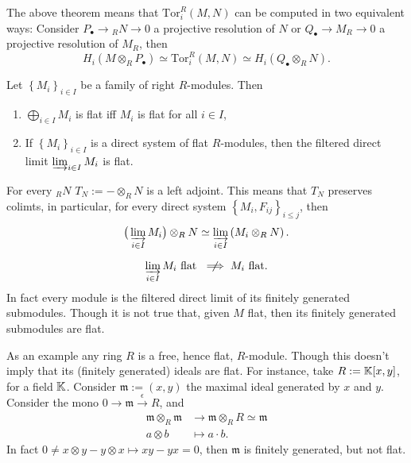 \begin{rem}[Consequence]
	The above theorem means that $\mathrm{Tor}_i^R(M,N)$ can be computed in two equivalent ways:
	Consider $P_{\bullet} \to {}_RN \to 0$ a projective resolution of $N$
	or $Q_{\bullet} \to M_R \to 0$ a projective resolution of $M_R$, then
	\begin{equation}
		H_i \left( M \otimes_R P_{\bullet} \right) \simeq
		\mathrm{Tor}_i^R (M,N) \simeq
		H_i \left( Q_{\bullet} \otimes_R N \right)
	.\end{equation} 
\end{rem}

\begin{prop}
	Let $\left\{ M_i \right\}_{i \in I}$ be a family of right $R$-modules.
	Then
	\begin{enumerate}
		\item $\bigoplus_{i \in I} M_i$ is flat iff $M_i$ is flat for all $i \in I$,
		\item If $\left\{ M_i \right\}_{i \in I}$ is a direct system of flat $R$-modules, 
			then the filtered direct limit $\varinjlim_{i \in I} M_i$ is flat.
	\end{enumerate}
\end{prop} 

\begin{rem}[]
	For every ${}_RN$ $T_N := - \otimes_R N$ is a left adjoint.
	This means that $T_N$ preserves colimts, 
	in particular, for every direct system $\left\{ M_i, F_{ij} \right\}_{i \leq j}$, then
	\begin{equation}
		\big( \varinjlim_{i \in I} M_i \big) \otimes_R N \simeq
		\varinjlim_{i \in I} \left( M_i \otimes_R N \right)
	.\end{equation} 
\end{rem}

\begin{rem}[]
	\begin{equation}
	\varinjlim_{i \in I} M_i \text{ flat } \centernot\implies M_i \text{ flat}
	.\end{equation} 
	In fact every module is the filtered direct limit of its finitely generated
	submodules.
	Though it is not true that, given $M$ flat, then its finitely generated submodules are flat.

	As an example any ring $R$ is a free, hence flat, $R$-module.
	Though this doesn't imply that its (finitely generated) ideals are flat.
	For instance, take $R := \mathbb{K}[x,y]$, for a field $\mathbb{K}$.
	Consider $\mathfrak{m} := (x,y)$ the maximal ideal generated by $x$ and $y$.
	Consider the mono $0 \to \mathfrak{m} \xrightarrow{\epsilon} R$, and
	\begin{align}
		\mathfrak{m} \otimes_R \mathfrak{m} &\to \mathfrak{m} \otimes_R R \simeq \mathfrak{m} \\
		a \otimes b &\mapsto a \cdot b
	.\end{align} 
	In fact $0 \neq x \otimes y - y \otimes x \mapsto xy - yx = 0$,
	then $\mathfrak{m}$ is finitely generated, but not flat.
\end{rem}

